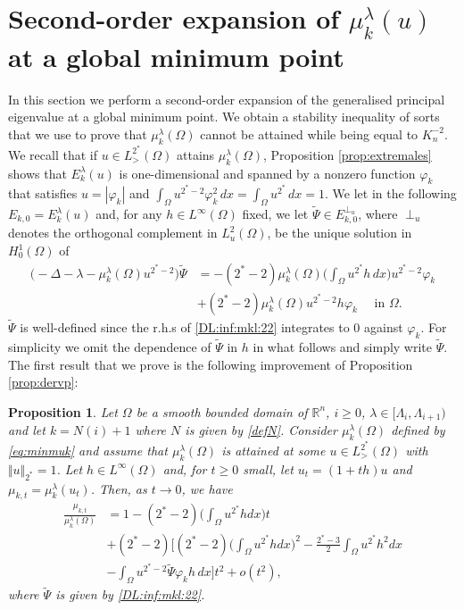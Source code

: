 \documentclass[10pt]{amsart}
\numberwithin{equation}{section}
\newcommand{\R}{\mathbb{R}}
\newcommand{\vp}{\varphi}
\newcommand{\Om}{\Omega}
\newcommand{\mkl}{\mu_{k}^{\lambda}}
\theoremstyle{plain}
\newtheorem{prop}{Proposition}[section]%
\theoremstyle{remark}
\begin{document}
\section{Second-order expansion of $\mkl(u)$ at a global minimum point} \label{ordre:deux}

In this section we perform a second-order expansion of the generalised principal eigenvalue at a global minimum point. We obtain a stability inequality of sorts that we use to prove that $\mkl(\Om)$ cannot be attained while being equal to $K_n^{-2}$. We recall that if $u\in L^{2^*}_{>}(\Om)$ attains $\mkl(\Om)$, Proposition \ref{prop:extremales} shows that $E_k^{\lambda}(u)$ is one-dimensional and spanned by a nonzero function $\vp_k$ that satisfies $u = |\vp_k|$ and $\int_\Om u^{2^*-2} \vp_k^2 \, dx = \int_{\Om} u^{2^*} \, dx = 1$. We let in the following $E_{k,0} = E_k^{\lambda}(u)$ and, for any $h \in L^\infty(\Om)$ fixed,  we let $\tilde{\Psi}  \in E_{k,0}^{\perp_{u}}$, where $\perp_u$ denotes the orthogonal complement in $L^2_u(\Om)$, be the unique solution in $H^1_0(\Om)$ of 
\begin{equation} \label{DL:inf:mkl:22}
\begin{aligned}
\big( - \Delta - \lambda - \mkl(\Om) u^{2^*-2} \big)\tilde{\Psi} & =- (2^*-2) \mkl(\Om) \Big( \int_{\Om} u^{2^*}h \, dx\Big) u^{2^*-2} \vp_k  \\
& + (2^*-2) \mkl(\Om) u^{2^*-2}h \vp_k \quad \text{ in } \Om. 
\end{aligned} 
\end{equation}
$\tilde{\Psi}$ is well-defined since the r.h.s of \eqref{DL:inf:mkl:22} integrates to $0$ against $\vp_k$. For simplicity we omit the dependence of $\tilde{\Psi}$ in $h$ in what follows and simply write $\tilde{\Psi}$. The first result that we prove is the following improvement of Proposition \ref{prop:dervp}: 


\begin{prop} \label{prop:derseconde}
Let $\Om$ be a smooth bounded domain of $\R^n$, $i \ge 0$, $\lambda \in [\Lambda_i, \Lambda_{i+1})$ and let $k = N(i)+1$ where $N$ is given by \eqref{defN}. Consider $\mkl(\Om)$ defined by \eqref{eq:minmuk} and assume that $\mkl(\Om)$ is attained at some $u \in L^{2^*}_{>}(\Om)$ with $\Vert u \Vert_{2^*} = 1$. Let $h \in L^\infty(\Om)$ and, for $t \ge 0$ small, let $u_t = (1+th) u$ and $\mu_{k,t} = \mkl(u_t)$. Then, as $t \to 0$, we have 
\begin{equation} \label{DL:mkl:2}
\begin{aligned}
\frac{\mu_{k,t}}{\mkl(\Om)} & = 1 - (2^*-2) \Big(\int_{\Om} u^{2^*}hdx \Big) t\\
&  + (2^*-2) \Bigg[ (2^*-2) \Big( \int_{\Om} u^{2^*}h dx\Big)^2 - \frac{2^*-3}{2} \int_{\Om} u^{2^*} h^2 dx  \\
& - \int_{\Om} u^{2^*-2} \tilde{\Psi} \vp_k h \, dx\Bigg] t^2 + o(t^2),
\end{aligned}  
\end{equation}
where $\tilde{\Psi}$ is given by \eqref{DL:inf:mkl:22}.
\end{prop}
\end{document}
